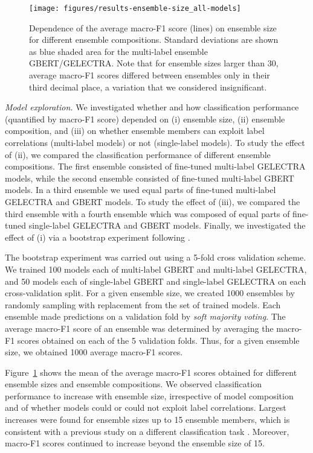 \documentclass[11pt,a4paper]{article}
\begin{document}
\begin{figure}
    \texttt{[image: figures/results-ensemble-size\_all-models]}
    \caption{Dependence of the average macro-F1 score (lines) on ensemble size for different ensemble compositions. Standard deviations are shown as blue shaded area for the multi-label ensemble GBERT/GELECTRA. Note that for ensemble sizes larger than 30, average macro-F1 scores differed between ensembles only in their third decimal place, a variation that we considered insignificant.}
    \label{fig:ensemble}
\end{figure}


\emph{Model exploration.}
We investigated whether and how classification performance (quantified by macro-F1 score) depended on (i) ensemble size, (ii) ensemble composition, and (iii) on whether ensemble members can exploit label correlations (\mbox{multi-label} models) or not (single-label models). To study the effect of (ii), we compared the classification performance of different ensemble compositions. The first ensemble consisted of fine-tuned multi-label GELECTRA models, while the second ensemble consisted of fine-tuned multi-label GBERT models. In a third ensemble we used equal parts of fine-tuned multi-label GELECTRA and GBERT models. To study the effect of (iii), we compared the third ensemble with a fourth ensemble which was composed of equal parts of \mbox{fine-tuned} single-label GELECTRA and GBERT models. Finally, we investigated the effect of (i) via a bootstrap experiment following \citet{Risch2020}.

The bootstrap experiment was carried out using a 5-fold cross validation scheme. We trained 100 models each of multi-label GBERT and multi-label GELECTRA, and 50 models each of single-label GBERT and single-label GELECTRA on each cross-validation split. For a given ensemble size, we created 1000 ensembles by randomly sampling with replacement from the set of trained models. Each ensemble made predictions on a validation fold by \emph{soft majority voting}. The average macro-F1 score of an ensemble was determined by averaging the macro-F1 scores obtained on each of the 5 validation folds. Thus, for a given ensemble size, we obtained 1000 average macro-F1 scores.

Figure~\ref{fig:ensemble} shows the mean of the average macro-F1 scores obtained for different ensemble sizes and ensemble compositions. We observed classification performance to increase with ensemble size, irrespective of model composition and of whether models could or could not exploit label correlations. Largest increases were found for ensemble sizes up to 15 ensemble members, which is consistent with a previous study on a different classification task \citep{Risch2020}. Moreover, macro-F1 scores continued to increase beyond the ensemble size of 15.
\end{document}
